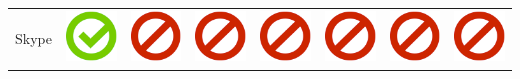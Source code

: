 \documentclass[10pt,foldmark,tumble]{leaflet}
\begin{document}
{{\begin{tabular}{ L{2cm} | C{2cm} | C{2cm} | C{2cm} | C{2cm} | C{2cm} | C{2cm} | C{2cm} | }
Skype & \includegraphics[scale=0.1]{pics/haken.png} & \includegraphics[scale=0.1]{pics/nohaken.png} & \includegraphics[scale=0.1]{pics/nohaken.png} & \includegraphics[scale=0.1]{pics/nohaken.png} & \includegraphics[scale=0.1]{pics/nohaken.png} & \includegraphics[scale=0.1]{pics/nohaken.png} & \includegraphics[scale=0.1]{pics/nohaken.png} \tabularnewline

\end{tabular}}}
\end{document}
